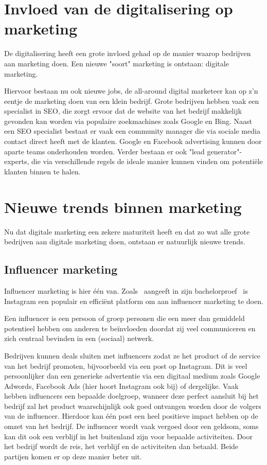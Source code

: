 \section{Invloed van de digitalisering op marketing}
\label{sec:digitalisering-marketing}
De digitalisering heeft een grote invloed gehad op de manier waarop bedrijven aan marketing doen. Een nieuwe "soort" marketing is ontstaan: digitale marketing. 

Hiervoor bestaan nu ook nieuwe jobs, de all-around digital marketeer kan op z'n eentje de marketing doen van een klein bedrijf. Grote bedrijven hebben vaak een specialist in SEO, die zorgt ervoor dat de website van het bedrijf makkelijk gevonden kan worden via populaire zoekmachines zoals Google en Bing. Naast een SEO specialist bestaat er vaak een community manager die via sociale media contact direct heeft met de klanten. Google en Facebook advertising kunnen door aparte teams onderhouden worden. Verder bestaan er ook "lead generator"-experts, die via verschillende regels de ideale manier kunnen vinden om potentiële klanten binnen te halen.

\section{Nieuwe trends binnen marketing}
\label{sec:nieuwe-trends-marketing}
Nu dat digitale marketing een zekere maturiteit heeft en dat zo wat alle grote bedrijven aan digitale marketing doen, ontstaan er natuurlijk nieuwe trends. 

\subsection{Influencer marketing}
\label{sec:influencer-marketing}
Influencer marketing is hier één van. Zoals~\textcite{Pieters2018} aangeeft in zijn bachelorproef~ is Instagram een populair en efficiënt platform om aan influencer marketing te doen. 

Een influencer is een persoon of groep personen die een meer dan gemiddeld potentieel hebben om anderen te beïnvloeden doordat zij veel communiceren en zich centraal bevinden in een (sociaal) netwerk.~\autocite{Pieters2018}

Bedrijven kunnen deals sluiten met influencers zodat ze het product of de service van het bedrijf promoten, bijvoorbeeld via een post op Instagram. Dit is veel persoonlijker dan een generieke advertentie via een digitaal medium zoals Google Adwords, Facebook Ads (hier hoort Instagram ook bij) of dergelijke. Vaak hebben influencers een bepaalde doelgroep, wanneer deze perfect aansluit bij het bedrijf zal het product waarschijnlijk ook goed ontvangen worden door de volgers van de influencer. Hierdoor kan één post een heel positieve impact hebben op de omzet van het bedrijf. De influencer wordt vaak vergoed door een geldsom, soms kan dit ook een verblijf in het buitenland zijn voor bepaalde activiteiten. Door het bedrijf wordt de reis, het verblijf en de activiteiten dan betaald. Beide partijen komen er op deze manier beter uit.


